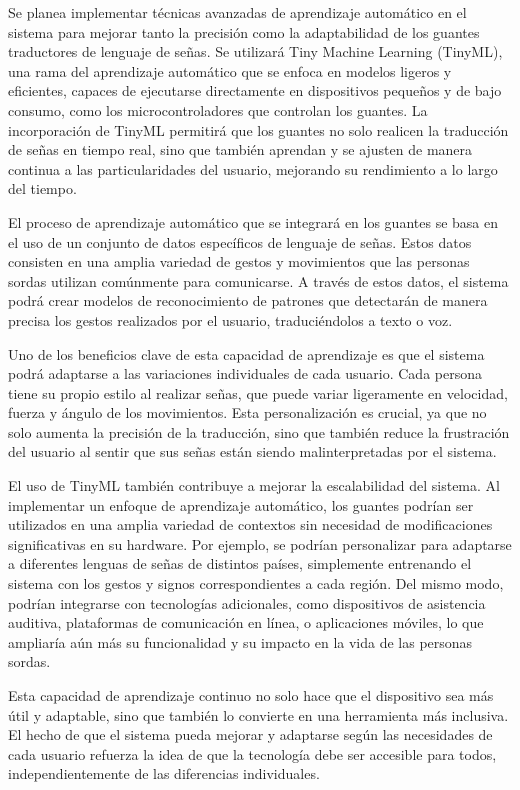 Se planea implementar técnicas avanzadas de aprendizaje automático en el sistema para mejorar tanto la precisión como la adaptabilidad de los guantes traductores de lenguaje de señas. Se utilizará Tiny Machine Learning (TinyML), una rama del aprendizaje automático que se enfoca en modelos ligeros y eficientes, capaces de ejecutarse directamente en dispositivos pequeños y de bajo consumo, como los microcontroladores que controlan los guantes. La incorporación de TinyML permitirá que los guantes no solo realicen la traducción de señas en tiempo real, sino que también aprendan y se ajusten de manera continua a las particularidades del usuario, mejorando su rendimiento a lo largo del tiempo.

El proceso de aprendizaje automático que se integrará en los guantes se basa en el uso de un conjunto de datos específicos de lenguaje de señas. Estos datos consisten en una amplia variedad de gestos y movimientos que las personas sordas utilizan comúnmente para comunicarse. A través de estos datos, el sistema podrá crear modelos de reconocimiento de patrones que detectarán de manera precisa los gestos realizados por el usuario, traduciéndolos a texto o voz.

Uno de los beneficios clave de esta capacidad de aprendizaje es que el sistema podrá adaptarse a las variaciones individuales de cada usuario. Cada persona tiene su propio estilo al realizar señas, que puede variar ligeramente en velocidad, fuerza y ángulo de los movimientos. Esta personalización es crucial, ya que no solo aumenta la precisión de la traducción, sino que también reduce la frustración del usuario al sentir que sus señas están siendo malinterpretadas por el sistema.

El uso de TinyML también contribuye a mejorar la escalabilidad del sistema. Al implementar un enfoque de aprendizaje automático, los guantes podrían ser utilizados en una amplia variedad de contextos sin necesidad de modificaciones significativas en su hardware. Por ejemplo, se podrían personalizar para adaptarse a diferentes lenguas de señas de distintos países, simplemente entrenando el sistema con los gestos y signos correspondientes a cada región. Del mismo modo, podrían integrarse con tecnologías adicionales, como dispositivos de asistencia auditiva, plataformas de comunicación en línea, o aplicaciones móviles, lo que ampliaría aún más su funcionalidad y su impacto en la vida de las personas sordas.

Esta capacidad de aprendizaje continuo no solo hace que el dispositivo sea más útil y adaptable, sino que también lo convierte en una herramienta más inclusiva. El hecho de que el sistema pueda mejorar y adaptarse según las necesidades de cada usuario refuerza la idea de que la tecnología debe ser accesible para todos, independientemente de las diferencias individuales.

